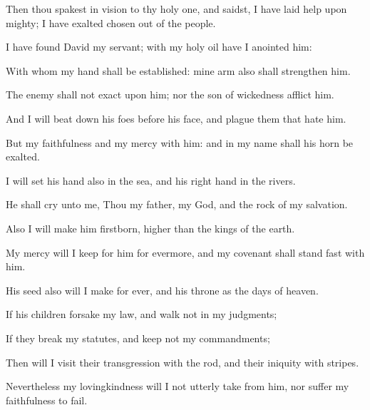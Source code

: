 {\Q {}Then thou
spakest in
vision to thy holy
one, and
saidst, I have
laid
help upon
{}
mighty; I have
exalted
{}
chosen out of the
people.


\par }{\Q {}I have
found
David my
servant; with my
holy
oil have I
anointed him:


\par }{\Q {}With whom my
hand shall be
established: mine
arm also shall
strengthen him.


\par }{\Q {}The
enemy shall not
exact upon him; nor the
son of
wickedness
afflict him.


\par }{\Q {}And I will beat
down his
foes before his
face, and
plague them that
hate him.


\par }{\Q {}But my
faithfulness and my
mercy
{} with him: and in my
name shall his
horn be
exalted.


\par }{\Q {}I will
set his
hand also in the
sea, and his right
hand in the
rivers.


\par }{\Q {}He shall
cry unto me, Thou
{} my
father, my
God, and the
rock of my
salvation.


\par }{\Q {}Also I will
make him
{}
firstborn,
higher than the
kings of the
earth.


\par }{\Q {}My
mercy will I
keep for him for
evermore, and my
covenant shall stand
fast with him.


\par }{\Q {}His
seed also will I
make
{} for
ever, and his
throne as the
days of
heaven.


\par }{\Q {}If his
children
forsake my
law, and
walk not in my
judgments;


\par }{\Q {}If they
break my
statutes, and
keep not my
commandments;


\par }{\Q {}Then will I
visit their
transgression with the
rod, and their
iniquity with
stripes.


\par }{\Q {}Nevertheless my
lovingkindness will I not utterly
take from him, nor suffer my
faithfulness to
fail.


}
